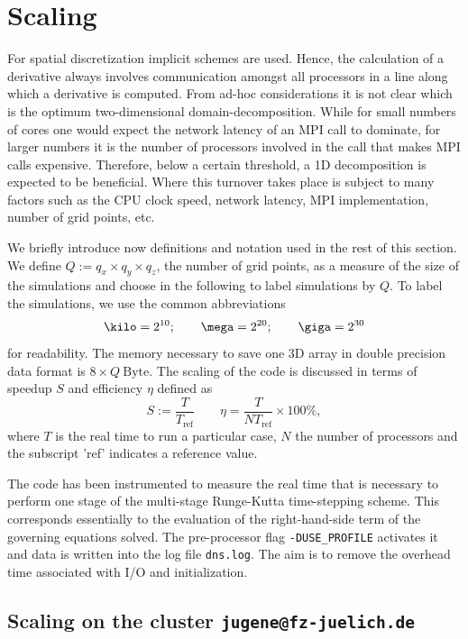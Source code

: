 \chapter{Scaling}\label{sec:scaling}

For spatial discretization implicit schemes are used. Hence, the calculation of
a derivative always involves communication amongst all processors in a line
along which a derivative is computed. From ad-hoc considerations it is not clear
which is the optimum two-dimensional domain-decomposition.  While for small
numbers of cores one would expect the network latency of an MPI call to
dominate, for larger numbers it is the number of processors involved in the call
that makes MPI calls expensive. Therefore, below a certain threshold, a 1D
decomposition is expected to be beneficial. Where this turnover takes place is
subject to many factors such as the CPU clock speed, network latency, MPI
implementation, number of grid points, etc.

We briefly introduce now definitions and notation used in the rest of this
section. We define $Q:=q_x\times q_y \times q_z$, the number of grid points, as
a measure of the size of the simulations and choose in the following to label
simulations by $Q$. To label the simulations, we use the common abbreviations
\begin{equation}
\kilo=2^{10};\qquad\mega=2^{20};\qquad\giga=2^{30}
\end{equation} 
for readability. The memory necessary to save one 3D array in double precision
data format is $8\times Q~\mathrm{Byte}$.  The scaling of the code is discussed
in terms of speedup $S$ and efficiency $\eta$ defined as
\begin{equation}
 S:=\frac{T}{T_\mathrm{ref}}\qquad \eta = \frac{T}{NT_\mathrm{ref}} \times 100\%,
\end{equation} 
where $T$ is the real time to run a particular case, $N$ the number of
processors and the subscript 'ref' indicates a reference value.

The code has been instrumented to measure the real time that is necessary to
perform one stage of the multi-stage Runge-Kutta time-stepping scheme.  This
corresponds essentially to the evaluation of the right-hand-side term of the
governing equations solved. The pre-processor flag \verb,-DUSE_PROFILE,
activates it and data is written into the log file \verb,dns.log,. The aim is to
remove the overhead time associated with I/O and initialization.

\section{Scaling on the cluster \texttt{jugene@fz-juelich.de}}

